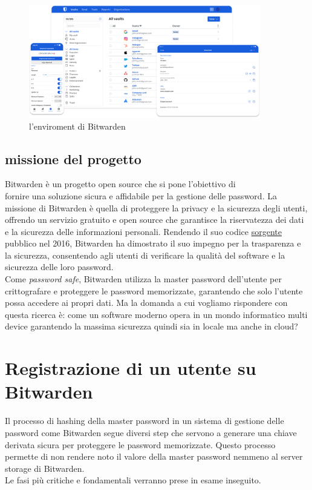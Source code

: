 \documentclass[a4paper,12pt]{report}
\begin{document}
		\begin{figure}[H]
			\centering
			\includegraphics[width=0.9\textwidth]{wardenEnviroment.png}
			\caption{l'enviroment di Bitwarden}
			\label{fig:eviroment}
		\end{figure}

		\section{missione del progetto}
		Bitwarden è un progetto open source che si pone l'obiettivo di \\
		fornire
		una soluzione sicura e affidabile per la gestione delle password. La
		missione di Bitwarden è quella di proteggere la privacy e la sicurezza
		degli utenti, offrendo un servizio gratuito e open source che garantisce
		la riservatezza dei dati e la sicurezza delle informazioni personali.
		Rendendo il suo codice \href{https://github.com/bitwarden}{sorgente}
		pubblico nel 2016, Bitwarden ha dimostrato il suo impegno per la
		trasparenza e la sicurezza, consentendo agli utenti di verificare la
		qualità del software e la sicurezza delle loro password.\\
		
		Come \textit{password safe}, Bitwarden utilizza la master password
		dell'utente per crittografare e proteggere le password memorizzate,
		garantendo che solo l'utente possa accedere ai propri dati. Ma la domanda
		a cui vogliamo rispondere con questa ricerca è: come un software moderno
		opera in un mondo informatico multi device garantendo la massima sicurezza
		quindi sia in locale ma anche in cloud?
		\chapter{Registrazione di un utente su Bitwarden}

		Il processo di hashing della master password in un sistema di gestione
		delle password come Bitwarden segue diversi step che servono a generare 
		una chiave derivata sicura per proteggere le password memorizzate. Questo
		processo permette di non rendere noto il valore della master password
		nemmeno al server storage di Bitwarden.\cite{login-encryption}\\
		Le fasi più critiche e fondamentali verranno prese in esame inseguito.
\end{document}
